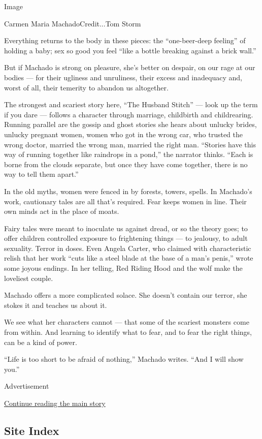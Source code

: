 Image

Carmen Maria MachadoCredit...Tom Storm

Everything returns to the body in these pieces: the ``one-beer-deep
feeling'' of holding a baby; sex so good you feel ``like a bottle
breaking against a brick wall.''

But if Machado is strong on pleasure, she's better on despair, on our
rage at our bodies --- for their ugliness and unruliness, their excess
and inadequacy and, worst of all, their temerity to abandon us
altogether.

The strongest and scariest story here, ``The Husband Stitch'' --- look
up the term if you dare --- follows a character through marriage,
childbirth and childrearing. Running parallel are the gossip and ghost
stories she hears about unlucky brides, unlucky pregnant women, women
who got in the wrong car, who trusted the wrong doctor, married the
wrong man, married the right man. ``Stories have this way of running
together like raindrops in a pond,'' the narrator thinks. ``Each is
borne from the clouds separate, but once they have come together, there
is no way to tell them apart.''

In the old myths, women were fenced in by forests, towers, spells. In
Machado's work, cautionary tales are all that's required. Fear keeps
women in line. Their own minds act in the place of moats.

Fairy tales were meant to inoculate us against dread, or so the theory
goes; to offer children controlled exposure to frightening things --- to
jealousy, to adult sexuality. Terror in doses. Even Angela Carter, who
claimed with characteristic relish that her work ``cuts like a steel
blade at the base of a man's penis,'' wrote some joyous endings. In her
telling, Red Riding Hood and the wolf make the loveliest couple.

Machado offers a more complicated solace. She doesn't contain our
terror, she stokes it and teaches us about it.

We see what her characters cannot --- that some of the scariest monsters
come from within. And learning to identify what to fear, and to fear the
right things, can be a kind of power.

``Life is too short to be afraid of nothing,'' Machado writes. ``And I
will show you.''

Advertisement

\protect\hyperlink{after-bottom}{Continue reading the main story}

\hypertarget{site-index}{%
\subsection{Site Index}\label{site-index}}

